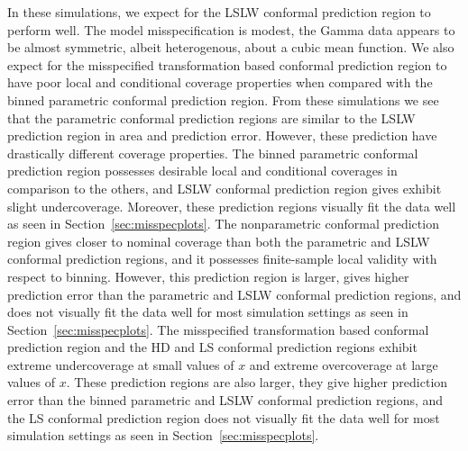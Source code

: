 \documentclass[11pt]{article}\usepackage[]{graphicx}\usepackage[]{color}
\begin{document}
In these simulations, we expect for the LSLW conformal prediction region to 
perform well.  The model misspecification is modest, the Gamma data  
appears to be almost symmetric, albeit heterogenous, about a cubic mean 
function.  
We also expect for the misspecified transformation based conformal 
prediction region to have poor local and conditional coverage properties 
when compared with the binned parametric conformal prediction region.
From these simulations we see that the parametric conformal 
prediction regions are similar to the LSLW prediction region in area and 
prediction error.  However, these prediction have drastically different 
coverage properties.  The binned parametric conformal prediction region 
possesses desirable local and conditional coverages in comparison to the 
others, and LSLW conformal prediction region gives exhibit slight 
undercoverage.  Moreover, these prediction regions visually 
fit the data well as seen in Section~\ref{sec:misspecplots}.
The nonparametric conformal prediction region gives closer to nominal 
coverage than both the parametric and LSLW conformal prediction regions, 
and it possesses finite-sample local validity with respect to 
binning.  However, this prediction region is larger, gives higher 
prediction error than the parametric and LSLW conformal prediction 
regions, and does not visually fit the data well for most simulation settings 
as seen in Section~\ref{sec:misspecplots}.  The misspecified transformation 
based conformal prediction region and the HD and LS 
conformal prediction regions exhibit extreme undercoverage at small values 
of $x$ and extreme overcoverage at large values of $x$.  These prediction 
regions are also larger, they give higher prediction error than the 
binned parametric and LSLW conformal prediction regions, and the LS 
conformal prediction region does not visually fit the data well for most 
simulation settings as seen in Section~\ref{sec:misspecplots}. 



\end{document}
